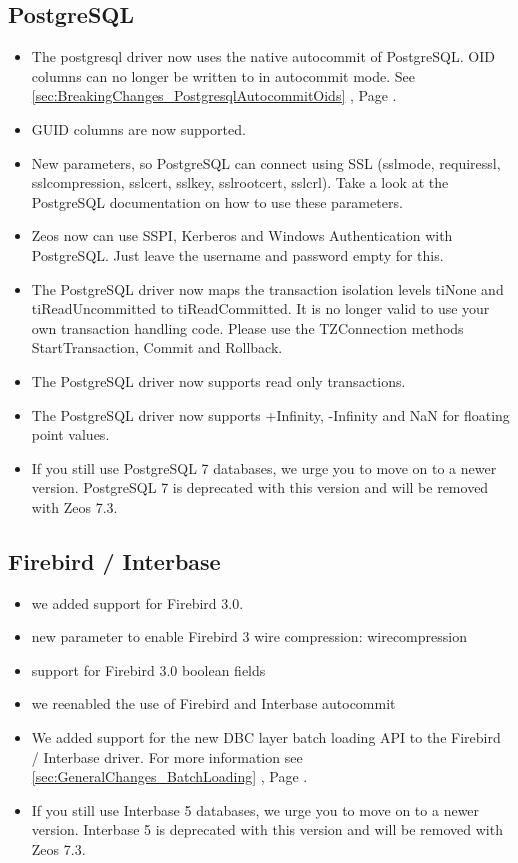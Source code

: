 \documentclass[a4paper,12pt,oneside]{article}
\begin{document}
\subsection{PostgreSQL}
\label{sec:DriverSpecificChanges_Postgresql}
\begin{itemize}
\item 
  The postgresql driver now uses the native autocommit of PostgreSQL. 
	OID columns can no longer be written to in autocommit mode.
	See \ref{sec:BreakingChanges_PostgresqlAutocommitOids} , Page \pageref{sec:BreakingChanges_PostgresqlAutocommitOids}.
\item GUID columns are now supported.
\item 
  New parameters, so PostgreSQL can connect using SSL (sslmode, requiressl, sslcompression, sslcert, sslkey, sslrootcert, sslcrl). 
	Take a look at the PostgreSQL documentation on how to use these parameters.
\item
  Zeos now can use SSPI, Kerberos and Windows Authentication with PostgreSQL.
	Just leave the username and password empty for this.
\item
  The PostgreSQL driver now maps the transaction isolation levels tiNone and tiReadUncommitted to tiReadCommitted.
	It is no longer valid to use your own transaction handling code.
	Please use the TZConnection methods StartTransaction, Commit and Rollback.
\item
  The PostgreSQL driver now supports read only transactions.
\item
  The PostgreSQL driver now supports +Infinity, -Infinity and NaN for floating point values.
\item
  If you still use PostgreSQL 7 databases, we urge you to move on to a newer version.
	PostgreSQL 7 is deprecated with this version and will be removed with Zeos 7.3.
\end{itemize}

\subsection{Firebird / Interbase}
\label{sec:DriverSpecificChanges_FirebirdInterbase}
\begin{itemize}
\item we added support for Firebird 3.0.
\item new parameter to enable Firebird 3 wire compression: wirecompression
\item support for Firebird 3.0 boolean fields
\item we reenabled the use of Firebird and Interbase autocommit
\item
  We added support for the new DBC layer batch loading API to the Firebird / Interbase driver.
	For more information see \ref{sec:GeneralChanges_BatchLoading} , Page \pageref{sec:GeneralChanges_BatchLoading}.
\item 
  If you still use Interbase 5 databases, we urge you to move on to a newer version.
	Interbase 5 is deprecated with this version and will be removed with Zeos 7.3.	
\end{itemize}
\end{document}
